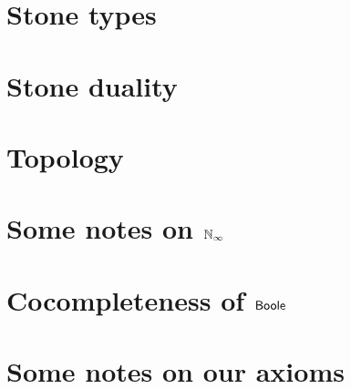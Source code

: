 \documentclass{../util/zariski}
\begin{document}
\section{Stone types}


\section{Stone duality}




\section{Topology}






%




\appendix
\section{Some notes on $\mathbb{N}_{\infty}$}


\section{Cocompleteness of $\mathsf{Boole}$}

\section{Some notes on our axioms}
\label{NotesOnAxioms}


%
\end{document}
